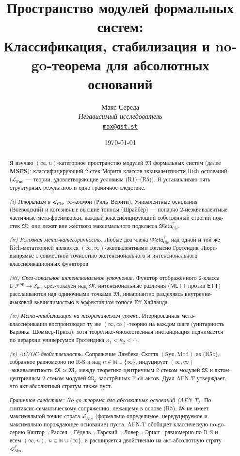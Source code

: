 \documentclass[11pt]{article}
\title{Пространство модулей формальных систем:\\
Классификация, стабилизация и no-go-теорема для абсолютных оснований}
\author{%
  \footnotesize Макс Середа \\[-3pt]
  \scriptsize\textit{Независимый исследователь} \\[-3pt]
  \scriptsize\texttt{\href{mailto:max@gst.st}{max@gst.st}}%
}
\date{\scriptsize\today}
\theoremstyle{plain}
\theoremstyle{definition}
\newcommand{\RS}{\mathrm{R\text{-}S}}
\newcommand{\cS}{\mathcal{S}}
\newcommand{\cF}{\mathcal{F}}
\newcommand{\fM}{\mathfrak{M}}
\newcommand{\Meta}{\mathfrak{Meta}}
\newcommand{\LFnd}{\mathcal{L}_{\mathrm{Fnd}}}
\newcommand{\LCls}{\mathcal{L}_{\mathrm{Cls}}}
\newcommand{\LAbs}{\mathcal{L}_{\mathrm{Abs}}}
\newcommand{\Sint}{\cS_{\mathrm{int}}}
\newcommand{\Syn}{\mathrm{Syn}}
\newcommand{\Mod}{\mathrm{Mod}}
\newcommand{\MLTT}{\mathsf{MLTT}}
\newcommand{\ETT}{\mathsf{ETT}}
\newcommand{\II}{\mathbf{I}}
\newcommand{\cE}{\mathcal{E}}
\begin{document}
\maketitle

\begin{abstract}
Я изучаю $(\infty, n)$-категорное пространство модулей $\fM$ формальных систем (далее \textbf{MSFS}): классифицирующий $2$-стек Морита-классов эквивалентности Rich-оснований ($\LFnd$ — теории, удовлетворяющие условиям (R1)--(R5)). Я устанавливаю пять структурных результатов и одно граничное следствие.

\emph{(i) Плюрализм в $\LCls$.} $\infty$-космои (Риль--Верити), Унивалентные основания (Воеводский) и когезивные высшие топосы (Шрайбер) — попарно $2$-неэквивалентные частичные мета-фреймворки, каждый классифицирующий собственный строгий под-стек $\fM$; они лежат вне жёсткого максимального подкласса $\Meta_{\mathrm{Cls}}^{\top}$.

\emph{(ii) Условная мета-категоричность.} Любые два члена $\Meta_{\mathrm{Cls}}^{\top}$ над одной и той же Rich-метатеорией являются $(\infty, \infty)$-эквивалентными согласно Гротендик--Люри-выпрямке с совместной точностью экстенсионального и интенсионального классификационных функторов.

\emph{(iii) Срез-локальное интенсиональное уточнение.} Функтор отображённого $2$-класса $\II : \cF^{\mathrm{op}} \to \Sint$ срез-локален над $\fM$: интенсиональные различия ($\MLTT$ против $\ETT$) расслаиваются над одиночными точками $\fM$, инвариантно разделяясь внутренне-языковой вычислимостью в эффективном топосе $\mathrm{Eff}$ Хайланда.

\emph{(iv) Мета-стабилизация на теоретическом уровне.} Итерированная мета-классификация воспроизводит ту же $(\infty, \infty)$-теорию на каждом шаге (унитарность Барвика--Шоммер-Приса), хотя теоретико-множественная инстанциация поднимается по иерархии универсумов Гротендика $\kappa_1 < \kappa_2 < \cdots$.

\emph{(v) AC/OC-двойственность.} Сопряжение Ламбека--Скотта $(\Syn, \Mod)$ из (R5b), собранное равномерно по $\RS$ и над $n \in \mathbb{N} \cup \{\infty\}$, индуцирует $(\infty, \infty)$-эквивалентность $\fM \simeq \fM_\cE$ между теоретико-центричным $2$-стеком модулей $\fM$ и актом-центричным $2$-стеком модулей $\fM_\cE$ заострённых Rich-актов. Дуал AFN-T утверждает, что акт-абсолютный стратум также пуст.

\emph{Граничное следствие: No-go-теорема для абсолютных оснований (AFN-T).} По синтаксис-семантическому сопряжению, лежащему в основе (R5), $\fM$ не имеет максимальной точки: страта $\LAbs$ (формально определимое, нередуцируемое и максимально порождающее основание) пуста. AFN-T обобщает классическую no-go-серию Кантор~\cite{Cantor1891}, Рассел~\cite{Russell1903}, Гёдель~\cite{Godel1931}, Тарский~\cite{Tarski1936}, Ловер~\cite{Lawvere1969}, Эрнст~\cite{Ernst2015} равномерно по $\RS$ и всем $(\infty, n)$, $n \in \mathbb{N} \cup \{\infty\}$, и расширяется двойственно на акт-абсолютную страту $\LAbs^\cE$.


\end{abstract}
\end{document}
